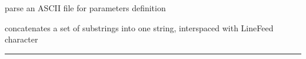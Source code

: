 \begin{related}
  \begin{sulist}{} %
  \item[\htmlref{parse\_xxx}{sub:parse_xxx}] parse an ASCII file for parameters definition
  \item[\htmlref{concatnl}{sub:concatnl}] concatenates a set of substrings into one string, interspaced
  with LineFeed character
  \end{sulist}
\end{related}

\rule{\hsize}{2mm}

